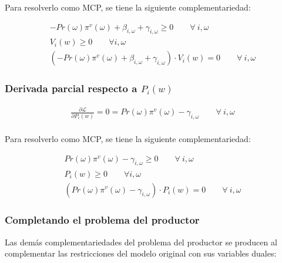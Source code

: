 Para resolverlo como MCP, se tiene la siguiente complementariedad:
\begin{footnotesize}
\begin{align}
    -Pr(\omega) \pi^v(\omega) + \beta_{i,\omega}  + \gamma_{i,\omega} \geq 0 \qquad \forall \  i, \omega \\
    V_i(w) \geq 0 \qquad \forall  i,\omega \\
    (-Pr(\omega) \pi^v(\omega) + \beta_{i,\omega}  + \gamma_{i,\omega}) \cdot  V_i(w) = 0  \qquad \forall \  i, \omega 
\end{align}

\end{footnotesize}


\subsubsection{Derivada parcial respecto a $P_i(w)$}
\begin{footnotesize}
\begin{align}
   \frac{\partial \mathcal{L} }{\partial P_i(w)}= 0
   = Pr(\omega) \pi^v(\omega) -\gamma_{i,\omega} \qquad \forall \  i, \omega \\
\end{align}

\end{footnotesize}


Para resolverlo como MCP, se tiene la siguiente complementariedad:
\begin{footnotesize}
\begin{align}
    Pr(\omega) \pi^v(\omega) -\gamma_{i,\omega} \geq 0 \qquad \forall \  i, \omega \\
    P_i(w) \geq 0 \qquad \forall  i,\omega \\
    (Pr(\omega) \pi^v(\omega) -\gamma_{i,\omega}) \cdot  P_i(w) = 0  \qquad \forall \  i, \omega 
\end{align}

\end{footnotesize}


\subsubsection{Completando el problema del productor}

Las demás complementariedades del problema del productor se producen al complementar las restricciones del modelo original con sus variables duales:

